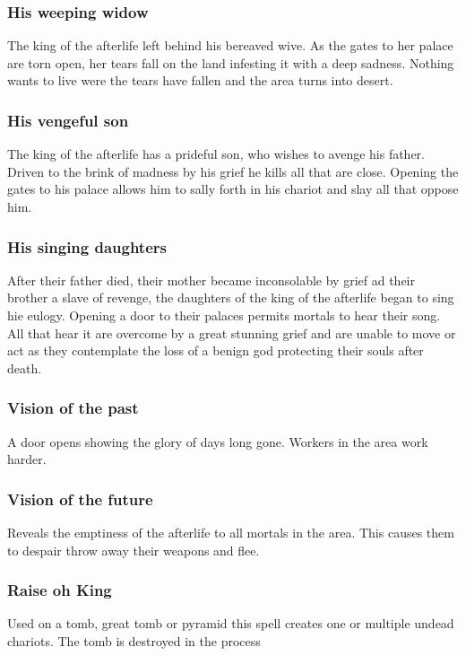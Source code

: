\subsubsection{His weeping widow}
The king of the afterlife left behind his bereaved wive. As the gates to her
palace are torn open, her tears fall on the land infesting it with a deep
sadness. Nothing wants to live were the tears have fallen and the area turns
into desert.

\subsubsection{His vengeful son}
The king of the afterlife has a prideful son, who wishes to avenge his father.
Driven to the brink of madness by his grief he kills all that are close.
Opening the gates to his palace allows him to sally forth in his chariot and
slay all that oppose him.

\subsubsection{His singing daughters}
After their father died, their mother became inconsolable by grief ad their
brother a slave of revenge, the daughters of the king of the afterlife began to
sing hie eulogy. Opening a door to their palaces permits mortals to hear their
song. All that hear it are overcome by a great stunning grief and are unable to
move or act as they contemplate the loss of a benign god protecting their souls
after death.

\subsubsection{Vision of the past}
A door opens showing the glory of days long gone. Workers in the area work
harder.

\subsubsection{Vision of the future}
Reveals the emptiness of the afterlife to all mortals in the area. This causes
them to despair throw away their weapons and flee.

\subsubsection{Raise oh King}
Used on a tomb, great tomb or pyramid this spell creates one or multiple undead
chariots. The tomb is destroyed in the process

